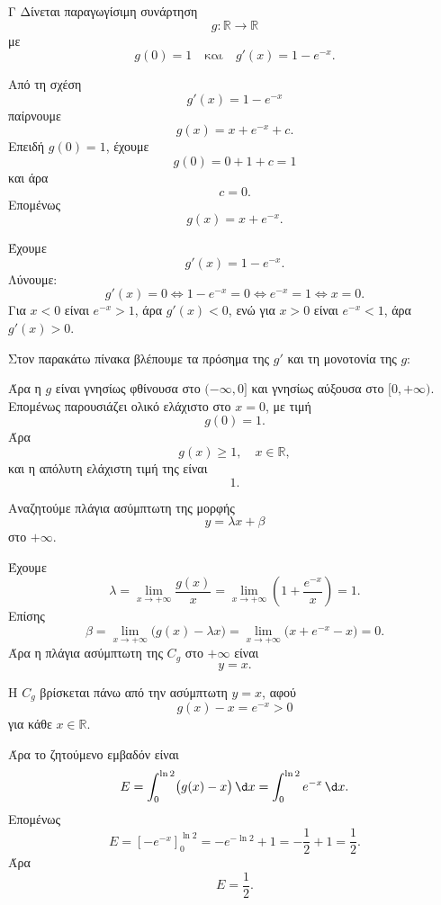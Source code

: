 \begin{thema}{Γ}
Δίνεται παραγωγίσιμη συνάρτηση
\[
g:\mathbb{R}\to\mathbb{R}
\]
με
\[
g(0)=1
\quad\text{και}\quad
g'(x)=1-e^{-x}.
\]
\begin{erwthma}
\item Από τη σχέση
\[
g'(x)=1-e^{-x}
\]
παίρνουμε
\[
g(x)=x+e^{-x}+c.
\]
Επειδή $g(0)=1$, έχουμε
\[
g(0)=0+1+c=1
\]
και άρα
\[
c=0.
\]
Επομένως
\[
{g(x)=x+e^{-x}}.
\]

\item Έχουμε
\[
g'(x)=1-e^{-x}.
\]
Λύνουμε:
\[
g'(x)=0
\Leftrightarrow
1-e^{-x}=0
\Leftrightarrow
e^{-x}=1
\Leftrightarrow
x=0.
\]
Για $x<0$ είναι $e^{-x}>1$, άρα $g'(x)<0$, ενώ για $x>0$ είναι $e^{-x}<1$, άρα $g'(x)>0$.

Στον παρακάτω πίνακα βλέπουμε τα πρόσημα της $g'$ και τη μονοτονία της $g$:
\begin{center}
\end{center}

Άρα η $g$ είναι γνησίως φθίνουσα στο $(-\infty,0]$ και γνησίως αύξουσα στο $[0,+\infty)$. Επομένως παρουσιάζει ολικό ελάχιστο στο $x=0$, με τιμή
\[
g(0)=1.
\]
Άρα
\[
{g(x)\geq1,\quad x\in\mathbb{R}},
\]
και η απόλυτη ελάχιστη τιμή της είναι
\[
{1}.
\]

\item Αναζητούμε πλάγια ασύμπτωτη της μορφής
\[
y=\lambda x+\beta
\]
στο $+\infty$.

Έχουμε
\[
\lambda=\lim_{x\to+\infty}\frac{g(x)}{x}
=\lim_{x\to+\infty}\left(1+\frac{e^{-x}}{x}\right)=1.
\]
Επίσης
\[
\beta=\lim_{x\to+\infty}\bigl(g(x)-\lambda x\bigr)
=\lim_{x\to+\infty}\bigl(x+e^{-x}-x\bigr)=0.
\]
Άρα η πλάγια ασύμπτωτη της $C_g$ στο $+\infty$ είναι
\[
{y=x}.
\]

\item Η $C_g$ βρίσκεται πάνω από την ασύμπτωτη $y=x$, αφού
\[
g(x)-x=e^{-x}>0
\]
για κάθε $x\in\mathbb{R}$.

Άρα το ζητούμενο εμβαδόν είναι
\[
E=\dint_0^{\ln2}\bigl(g(x)-x\bigr)\,\d x
=\dint_0^{\ln2}e^{-x}\,\d x.
\]
Επομένως
\[
E=\left[-e^{-x}\right]_0^{\ln2}
=-e^{-\ln2}+1
=-\frac12+1
=\frac12.
\]
Άρα
\[
{E=\frac12}.
\]
\end{erwthma}
\end{thema}

